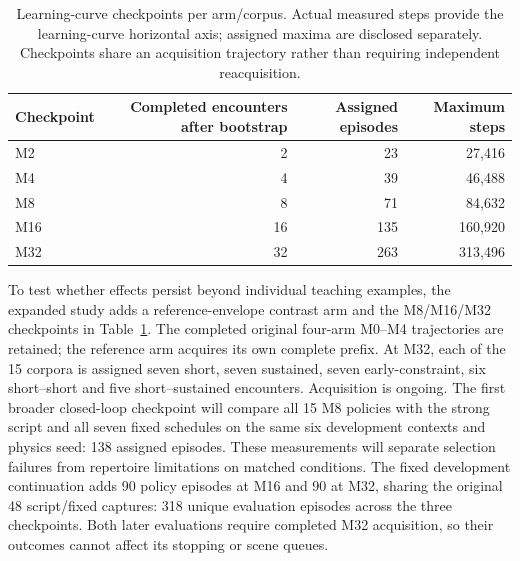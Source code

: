 \documentclass[10pt]{article}
\begin{document}
\begin{table}[t]
\centering\small
\begin{tabular}{lrrr}
\toprule
Checkpoint & Completed encounters after bootstrap & Assigned episodes & Maximum steps \\
\midrule
M2 & 2 & 23 & 27,416 \\
M4 & 4 & 39 & 46,488 \\
M8 & 8 & 71 & 84,632 \\
M16 & 16 & 135 & 160,920 \\
M32 & 32 & 263 & 313,496 \\
\bottomrule
\end{tabular}
\caption{Learning-curve checkpoints per arm/corpus. Actual measured steps
provide the learning-curve horizontal axis; assigned maxima are disclosed
separately. Checkpoints share an acquisition trajectory rather than requiring
independent reacquisition.}
\label{tab:budgets}
\end{table}

To test whether effects persist beyond individual teaching examples, the
expanded study adds a reference-envelope contrast arm and the M8/M16/M32
checkpoints in Table~\ref{tab:budgets}. The completed original four-arm M0--M4
trajectories are retained; the reference arm acquires its own complete prefix. At M32, each
of the 15 corpora is assigned seven short, seven sustained, seven early-constraint,
six short--short and five short--sustained encounters. Acquisition is ongoing.
The first broader closed-loop checkpoint will compare all 15 M8 policies with
the strong script and all seven fixed schedules on the same six development
contexts and physics seed: 138 assigned episodes. These measurements will
separate selection failures from repertoire limitations on matched conditions.
The fixed development continuation adds 90 policy episodes at M16 and 90 at
M32, sharing the original 48 script/fixed captures: 318 unique evaluation
episodes across the three checkpoints. Both later evaluations require completed
M32 acquisition, so their outcomes cannot affect its stopping or scene queues.
\end{document}
